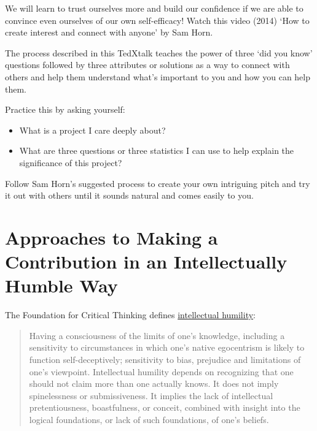 \documentclass[
]{book}
\providecommand{\tightlist}{%
  \setlength{\itemsep}{0pt}\setlength{\parskip}{0pt}}
\begin{document}
\begin{reflect}
We will learn to trust ourselves more and build our confidence if we are
able to convince even ourselves of our own self-efficacy! Watch this
video (2014) `How to create interest and connect with anyone' by Sam
Horn.

The process described in this TedXtalk teaches the power of three `did
you know' questions followed by three attributes or solutions as a way
to connect with others and help them understand what's important to you
and how you can help them.

Practice this by asking yourself:

\begin{itemize}
\tightlist
\item
  What is a project I care deeply about?
\item
  What are three questions or three statistics I can use to help explain
  the significance of this project?
\end{itemize}

Follow Sam Horn's suggested process to create your own intriguing pitch
and try it out with others until it sounds natural and comes easily to
you.
\end{reflect}

\hypertarget{approaches-to-making-a-contribution-in-an-intellectually-humble-way}{%
\section{Approaches to Making a Contribution in an Intellectually Humble Way}\label{approaches-to-making-a-contribution-in-an-intellectually-humble-way}}

The Foundation for Critical Thinking defines \href{http://www.criticalthinking.org/pages/valuable-intellectual-traits/528}{intellectual humility}:

\begin{quote}
Having a consciousness of the limits of one's knowledge, including a sensitivity to circumstances in which one's native egocentrism is likely to function self-deceptively; sensitivity to bias, prejudice and limitations of one's viewpoint. Intellectual humility depends on recognizing that one should not claim more than one actually knows. It does not imply spinelessness or submissiveness. It implies the lack of intellectual pretentiousness, boastfulness, or conceit, combined with insight into the logical foundations, or lack of such foundations, of one's beliefs.~
\end{quote}
\end{document}
